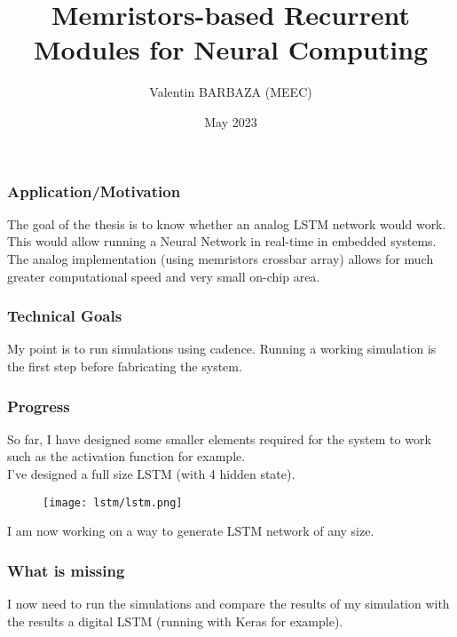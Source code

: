 \documentclass{beamer}
\title[MSc Thesis]
{Memristors-based Recurrent Modules for Neural Computing}
\institute[IST] %
{%
  Diogo Caetano\\
  INESC-MN
  \and%
  Ruxandra Barlulescu\\
  INESC-ID
  }
\author[V. BARBAZA]{Valentin BARBAZA (MEEC)}
\date[2023] %
  {May 2023}
\begin{document}
  \frame{\titlepage}


  \begin{frame}
    \frametitle{Application/Motivation}
    The goal of the thesis is to know whether an analog LSTM network would work. This would allow running a Neural Network in real-time in embedded systems. The analog implementation (using memristors crossbar array) allows for much greater computational speed and very small on-chip area.
  \end{frame}
  \begin{frame}
    \frametitle{Technical Goals}
    My point is to run simulations using cadence. Running a working simulation is the first step before fabricating the system.
  \end{frame}
  \begin{frame}
    \frametitle{Progress}
    So far, I have designed some smaller elements required for the system to work such as the activation function for example.\\
    I've designed a full size LSTM (with 4 hidden state).
    \begin{figure}
      \centering
      \texttt{[image: lstm/lstm.png]}
    \end{figure}
    I am now working on a way to generate LSTM network of any size.
  \end{frame}

  \begin{frame}
    \frametitle{What is missing}
    I now need to run the simulations and compare the results of my simulation with the results a digital LSTM (running with Keras for example).
  \end{frame}

  
\end{document}
